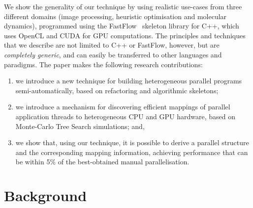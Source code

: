\documentclass[smallextended]{svjour3}
\begin{document}
We show the generality of our technique by using realistic 
use-cases from three different domains (image processing, 
heuristic optimisation and molecular dynamics), %
programmed using the FastFlow~\cite{AldinucciDKMT11} skeleton library for C++, which uses OpenCL and CUDA for GPU computations. The principles and techniques that we
describe are not limited to C++ or FastFlow, however, but are \emph{completely generic}, and can easily be
transferred to other languages and paradigms.
%
The paper makes the following research contributions:
\begin{enumerate}
\item we introduce a new technique for building
  heterogeneous parallel programs semi-automatically, based on refactoring and algorithmic skeletons;
\item we introduce a mechanism for discovering
  efficient mappings of parallel application threads to heterogeneous CPU
  and GPU hardware, based on Monte-Carlo Tree Search simulations; and,
\item we
  show that, using our technique, 
  it is possible to derive a parallel structure and the corresponding mapping information, achieving
  performance that can be within 5\% of the best-obtained manual parallelisation.
\end{enumerate}

\section{Background} \label{sec:background}
\end{document}
